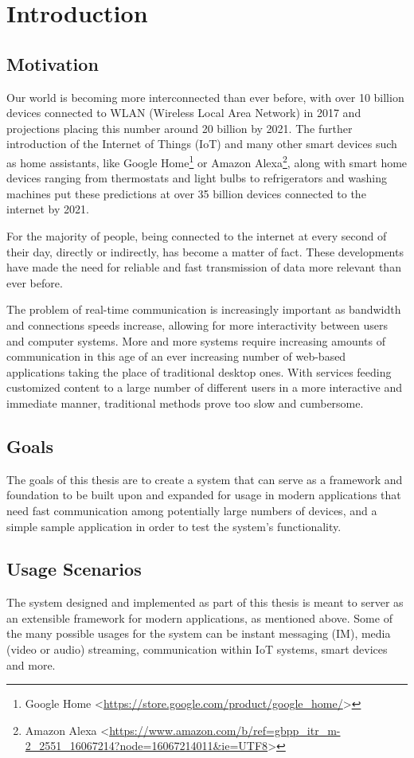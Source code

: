 \chapter{Introduction}

\section{Motivation}

Our world is becoming more interconnected than ever before, with over 10 billion devices connected to WLAN (Wireless Local Area Network) in 2017 and projections placing this number around 20 billion by 2021\cite{devices-on-wlan-2017}. The further introduction of the Internet of Things (IoT) and many other smart devices such as home assistants, like Google Home\footnote{Google Home <\url{https://store.google.com/product/google_home/}>} or Amazon Alexa\footnote{Amazon Alexa <\url{https://www.amazon.com/b/ref=gbpp_itr_m-2_2551_16067214?node=16067214011&ie=UTF8}>}, along with smart home devices ranging from thermostats and light bulbs to refrigerators and washing machines put these predictions at over 35 billion devices connected to the internet by 2021\cite{iot-devices}.

For the majority of people, being connected to the internet at every second of their day, directly or indirectly, has become a matter of fact. These developments have made the need for reliable and fast transmission of data more relevant than ever before.

The problem of real-time communication is increasingly important as bandwidth and connections speeds increase, allowing for more interactivity between users and computer systems. More and more systems require increasing amounts of communication in this age of an ever increasing number of web-based applications taking the place of traditional desktop ones. With services feeding customized content to a large number of different users in a more interactive and immediate manner, traditional methods prove too slow and cumbersome.

\section{Goals}

The goals of this thesis are to create a system that can serve as a framework and foundation to be built upon and expanded for usage in modern applications that need fast communication among potentially large numbers of devices, and a simple sample application in order to test the system's functionality.

\section{Usage Scenarios}

The system designed and implemented as part of this thesis is meant to server as an extensible framework for modern applications, as mentioned above. Some of the many possible usages for the system can be instant messaging (IM), media (video or audio) streaming, communication within IoT systems, smart devices and more.
